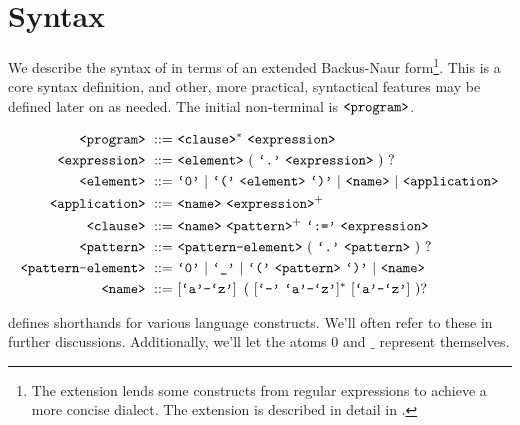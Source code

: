 \section{Syntax}\label{section:d-syntax}

We describe the syntax of \D{} in terms of an extended Backus-Naur
form\footnote{The extension lends some constructs from regular expressions to
achieve a more concise dialect. The extension is described in detail in
.}. This is a core syntax definition, and other, more
practical, syntactical features may be defined later on as needed. The initial
non-terminal is $\text{{\ttfamily<program>}}$.

\begin{align}
\nonterm{program}\ ::=&\ \nonterm{clause}^*\ \nonterm{expression}\\
\nonterm{expression}\ ::=&\ \nonterm{element}\ (\ \term{.}\ \nonterm{expression}
\ )\ ?\\
\nonterm{element}\ ::=&\ \term{0}\ |\ \term{(}\ \nonterm{element}\ \term{)}\ |
\ \nonterm{name}\ |\ \nonterm{application}\\
\nonterm{application}\ ::=&\ \nonterm{name}
\ \nonterm{expression}^+\\
\nonterm{clause}\ ::=&\ \nonterm{name}\ \nonterm{pattern}^+
\ \term{:=}\ \nonterm{expression}\\
\label{nonterm-pattern}
\nonterm{pattern}\ ::=&\ \nonterm{pattern-element}\ (\ \term{.}
\ \nonterm{pattern}\ )\ ?\\
\label{nonterm-pattern-element}
\nonterm{pattern-element}\ ::=&\ \term{0}\ |\ \term{\_}\ |\ \term{(}
\ \nonterm{pattern}\ \term{)}\ |\ \nonterm{name}\\
\nonterm{name}\ ::=&\ [\term{a}\mathmono{-}\term{z}]
\ \left (\ [\term{-}\ \term{a}\mathmono{-}\term{z}]^*
\ [\term{a}\mathmono{-}\term{z}]\ \right )?
\end{align}

\begin{definition}  defines shorthands for
various language constructs. We'll often refer to these in further discussions.
Additionally, we'll let the atoms $0$ and $\_$ represent
themselves.\end{definition} 

